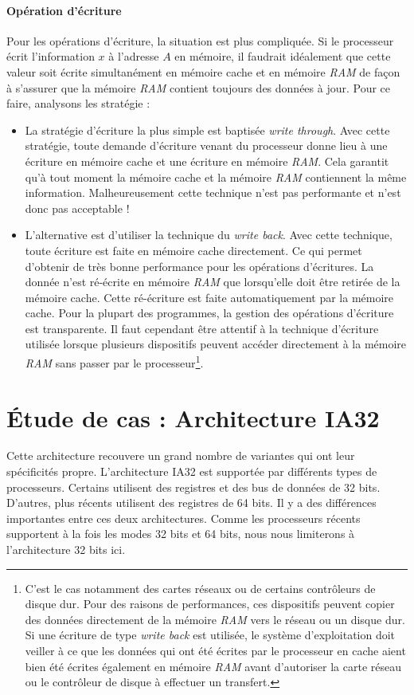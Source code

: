 \paragraph{Opération d'écriture} Pour les opérations d'écriture, la situation est plus compliquée.
Si le processeur écrit l'information $x$ à l'adresse $A$ en mémoire, il faudrait idéalement que cette valeur soit écrite simultanément en mémoire cache et en mémoire \textit{RAM} de façon à s'assurer que la mémoire \textit{RAM} contient toujours des données à jour.
Pour ce faire, analysons les stratégie :
\begin{itemize}
  \item La stratégie d'écriture la plus simple est baptisée \emph{write through}.
    Avec cette stratégie, toute demande d'écriture venant du processeur donne lieu à une écriture en mémoire cache et une écriture en mémoire \textit{RAM}.
    Cela garantit qu'à tout moment la mémoire cache et la mémoire \textit{RAM} contiennent la même information.
    Malheureusement cette technique n'est pas performante et n'est donc pas acceptable !
  \item L'alternative est d'utiliser la technique du \emph{write back}.
    Avec cette technique, toute écriture est faite en mémoire cache directement.
    Ce qui permet d'obtenir de très bonne performance pour les opérations d'écritures.
    La donnée n'est ré-écrite en mémoire \textit{RAM} que lorsqu'elle doit être retirée de la mémoire cache.
    Cette ré-écriture est faite automatiquement par la mémoire cache.
    Pour la plupart des programmes, la gestion des opérations d'écriture est transparente.
    Il faut cependant être attentif à la technique d'écriture utilisée lorsque plusieurs dispositifs peuvent accéder directement à la mémoire \textit{RAM} sans passer par le processeur\footnote{C'est le cas notamment des cartes réseaux ou de certains contrôleurs de disque dur.
      Pour des raisons de performances, ces dispositifs peuvent copier des données directement de la mémoire \textit{RAM} vers le réseau ou un disque dur.
    Si une écriture de type \emph{write back} est utilisée, le système d'exploitation doit veiller à ce que les données qui ont été écrites par le processeur en cache aient bien été écrites également en mémoire \textit{RAM} avant d'autoriser la carte réseau ou le contrôleur de disque à effectuer un transfert.}.
\end{itemize}

\section{Étude de cas : Architecture IA32}
Cette architecture recouvere un grand nombre de variantes qui ont leur spécificités propre.
L'architecture IA32 est supportée par différents types de processeurs.
Certains utilisent des registres et des bus de données de 32 bits.
D'autres, plus récents utilisent des registres de 64 bits.
Il y a des différences importantes entre ces deux architectures.
Comme les processeurs récents supportent à la fois les modes 32 bits et 64 bits, nous nous limiterons à l'architecture 32 bits ici.


